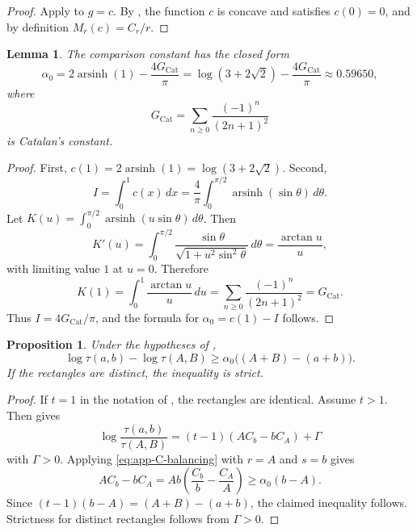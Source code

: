 \documentclass[11pt]{article}
\numberwithin{equation}{section}
\newtheorem{lemma}[lemma]{Lemma}
\newtheorem{proposition}[proposition]{Proposition}
\DeclareMathOperator{\arsinh}{arsinh}
\newcommand{\dd}{\,d}
\begin{document}
\begin{proof}
Apply  to $g=c$. By , the function $c$ is concave and satisfies $c(0)=0$, and by definition $M_r(c)=C_r/r$.
\end{proof}

\begin{lemma}\label{lem:app-alpha-zero}
The comparison constant has the closed form
\[
  \alpha_0
  =
  2\arsinh(1)-\frac{4G_{\mathrm{Cat}}}{\pi}
  =
  \log(3+2\sqrt{2})-\frac{4G_{\mathrm{Cat}}}{\pi}
  \approx 0.59650,
\]
where
\[
  G_{\mathrm{Cat}}=\sum_{n\ge0}\frac{(-1)^n}{(2n+1)^2}
\]
is Catalan's constant.
\end{lemma}

\begin{proof}
First, $c(1)=2\arsinh(1)=\log(3+2\sqrt{2})$. Second,
\[
  I=\int_0^1 c(x)\dd x
  =
  \frac4\pi\int_0^{\pi/2}\arsinh(\sin\theta)\dd\theta.
\]
Let $K(u)=\int_0^{\pi/2}\arsinh(u\sin\theta)\dd\theta$. Then
\[
  K'(u)
  =
  \int_0^{\pi/2}
  \frac{\sin\theta}{\sqrt{1+u^2\sin^2\theta}}\dd\theta
  =
  \frac{\arctan u}{u},
\]
with limiting value $1$ at $u=0$. Therefore
\[
  K(1)=\int_0^1\frac{\arctan u}{u}\dd u
  =
  \sum_{n\ge0}\frac{(-1)^n}{(2n+1)^2}
  =
  G_{\mathrm{Cat}}.
\]
Thus $I=4G_{\mathrm{Cat}}/\pi$, and the formula for $\alpha_0=c(1)-I$ follows.
\end{proof}

\begin{proposition}\label{prop:app-old-balancing}
Under the hypotheses of ,
\[
  \log\tau(a,b)-\log\tau(A,B)
  \ge
  \alpha_0\bigl((A+B)-(a+b)\bigr).
\]
If the rectangles are distinct, the inequality is strict.
\end{proposition}

\begin{proof}
If $t=1$ in the notation of , the rectangles are identical. Assume $t>1$. Then  gives
\[
  \log\frac{\tau(a,b)}{\tau(A,B)}
  =
  (t-1)(AC_b-bC_A)+\Gamma
\]
with $\Gamma>0$. Applying \eqref{eq:app-C-balancing} with $r=A$ and $s=b$ gives
\[
  AC_b-bC_A
  =
  Ab\left(\frac{C_b}{b}-\frac{C_A}{A}\right)
  \ge
  \alpha_0(b-A).
\]
Since $(t-1)(b-A)=(A+B)-(a+b)$, the claimed inequality follows. Strictness for distinct rectangles follows from $\Gamma>0$.
\end{proof}
\end{document}
